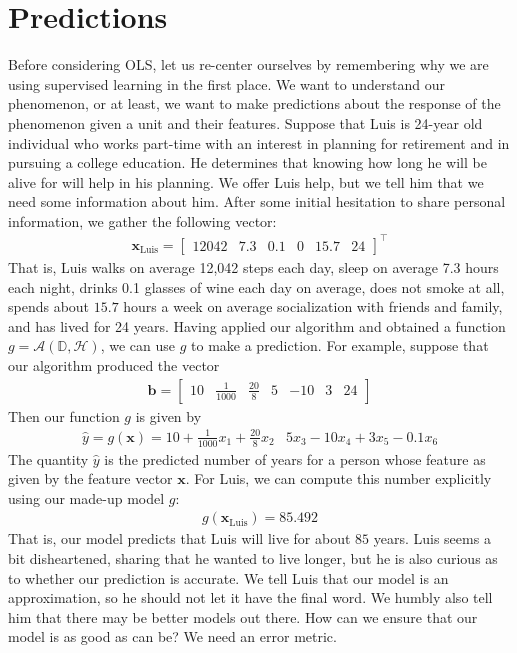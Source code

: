\documentclass[12pt]{article}
\begin{document}
	\section{Predictions}
	Before considering OLS, let us re-center ourselves by remembering why
	we are using supervised learning in the first place. We want to understand
	our phenomenon, or at least, we want to make predictions about the response
	of the phenomenon given a unit and their features. Suppose that Luis
	is 24-year old individual who works part-time with an interest in planning
	for retirement and in pursuing a college education. He determines that knowing how
	long he will be alive for will help in his planning. We offer Luis help, but we tell
	him that we need some information about him. After some initial hesitation to share
	personal information, we gather the following vector:
	\begin{align*}
		\bm{x}_{\text{Luis}} = \begin{bmatrix}
			12042 & 7.3 & 0.1 & 0 & 15.7 & 24
		\end{bmatrix}^\top
	\end{align*}
	That is, Luis walks on average 12,042 steps each day, sleep on average 7.3 hours
	each night, drinks 0.1 glasses of wine each day on average, does not smoke at all,
	spends about $15.7$ hours a week on average socialization with friends and family,
	and has lived for 24 years.
	Having applied our algorithm and obtained a function $g=\mathcal{A}(\mathbb{D}, \mathcal{H})$,
	we can use $g$ to make a prediction. For example, suppose that our algorithm
	produced the vector
	\begin{align*}
		\bm{b} = \begin{bmatrix}
			10 & \frac{1}{1000} & \frac{20}{8} & 5 & -10 & 3 & 24
		\end{bmatrix}
	\end{align*}
	Then our function $g$ is given by
	\begin{align*}
		\hat{y} = g(\bm{x}) = 10 + \frac{1}{1000}x_1 + \frac{20}{8}x_2 & 5x_3 - 10x_4 + 3x_5
		-0.1x_6
	\end{align*}
	The quantity $\hat{y}$ is the predicted number of years for a person
	whose feature as given by the feature vector $\bm{x}$. For Luis, we
	can compute this number explicitly using our made-up model $g$:
	\begin{align*}
		g(\bm{x}_{\text{Luis}}) = 85.492
	\end{align*}
	That is, our model predicts that Luis will live for about $85$ years.
	Luis seems a bit disheartened, sharing that he wanted to live longer,
	but he is also curious as to whether our prediction is accurate. We tell
	Luis that our model is an approximation, so he should not let it have
	the final word. We humbly also tell him that there may be better models out
	there. How can we ensure that our model is as good as can be? We need
	an error metric.
\end{document}
